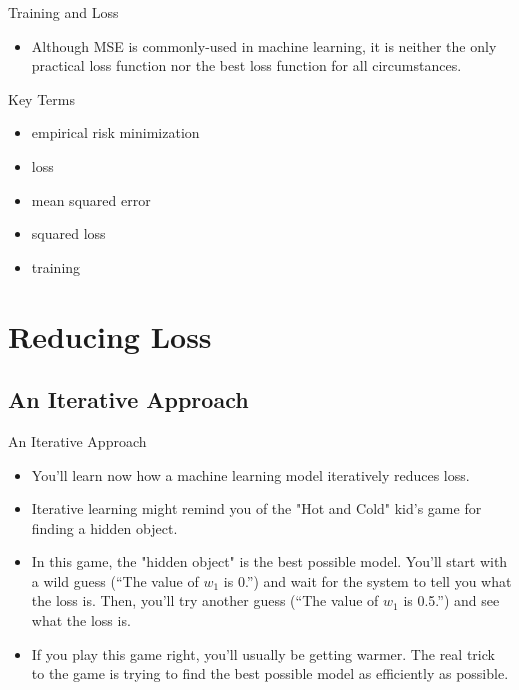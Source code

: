 \documentclass{beamer}
\begin{document}
\begin{frame}{Training and Loss}
\begin{itemize}
    \item Although MSE is commonly-used in machine learning, it is neither the only practical loss function nor the best loss function for all circumstances.
\end{itemize}
\end{frame}

\begin{frame}{Key Terms}
    \begin{itemize}
        \item empirical risk minimization
        \item loss
        \item mean squared error
        \item squared loss
        \item training
    \end{itemize}
\end{frame}

\section{Reducing Loss}

\subsection{An Iterative Approach}

\begin{frame}{An Iterative Approach}

\begin{itemize}
    \item You'll learn now how a machine learning model iteratively reduces loss.
    
    \item Iterative learning might remind you of the "Hot and Cold" kid's game for finding a hidden object. 
    
    \item In this game, the "hidden object" is the best possible model. You'll start with a wild guess (``The value of $w_1$ is 0.'') and wait for the system to tell you what the loss is. Then, you'll try another guess (``The value of $w_1$ is 0.5.'') and see what the loss is. 
    \item If you play this game right, you'll usually be getting warmer. The real trick to the game is trying to find the best possible model as efficiently as possible.
\end{itemize}

\end{frame}
\end{document}
